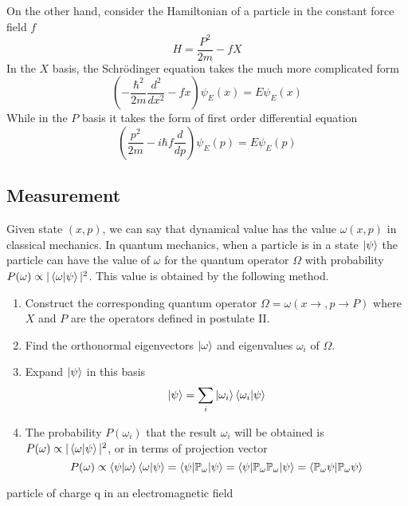 \documentclass[../../../main.tex]{subfiles}
\begin{document}
On the other hand, consider the Hamiltonian of a particle in the constant force field $f$
\begin{equation*}
    H=\frac{P^2 }{2m }-fX
\end{equation*}
In the $X$ basis, the Schrödinger equation takes the much more complicated form 
\begin{equation*}
    \left( -\frac{\hbar^2}{2m }\frac{d^2 }{dx^2}-fx \right)\psi_E(x)=E\psi_E(x) 
\end{equation*}
While in the $P$ basis it takes the form of first order differential equation
\begin{equation*}
    \left( \frac{p^2 }{2m }-i \hbar f \frac{d }{dp }     \right)\psi_E (p)=E\psi_E(p) 
\end{equation*}

\subsection{Measurement}
Given state $(x,p)$, we can say that dynamical value has the value $\omega(x,p)$ in classical mechanics.
In quantum mechanics, when a particle is in a state $\ket{\psi } $ the particle can have the value of $\omega$ for the quantum operator $\Omega$ with probability $P(\omega)\propto|\braket{\omega|\psi}  |^2$. 
This value is obtained by the following method.
\begin{enumerate}
    \item Construct the corresponding quantum operator $\Omega=\omega(x \rightarrow ,p \rightarrow P)$ where $X$ and $P$ are the operators defined in postulate II.
    \item Find the orthonormal eigenvectors $\ket{\omega} $ and eigenvalues $\omega_i$ of $\Omega$.
    \item Expand $\ket{\psi } $ in this basis
    \begin{equation*}
        \ket{\psi }=\sum_i  \ket{\omega_i } \braket{\omega_i |\psi}  
    \end{equation*}
    \item The probability $P(\omega_i)$ that the result $\omega_i$ will be obtained is $P(\omega)\propto|\braket{\omega|\psi}  |^2$, or in terms of projection vector
    \begin{equation*}
        P(\omega)\propto \braket{\psi|\omega } \braket{\omega|\psi}=\braket{\psi|\mathbb{P}_\omega|\psi  }=\braket{\psi|\mathbb{P } _\omega \mathbb{P } _\omega |\psi   }=\braket{\mathbb{P } _\omega \psi| \mathbb{P } _\omega \psi  }    
    \end{equation*}
\end{enumerate}
particle of charge q in an electromagnetic field
\end{document}
